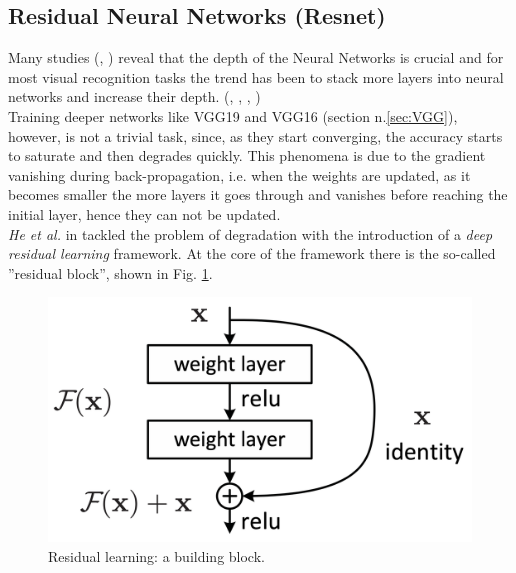 \subsection[Residual Neural Networks]{Residual Neural Networks (Resnet)}
Many studies (\citep{simonyan2015deep}, \cite{szegedy2014going}) reveal that the depth of the Neural Networks is crucial and for most visual recognition tasks the trend has been to stack more layers into neural networks and increase their depth. (\cite{simonyan2015deep}, \cite{ioffe2015batch}, \cite{girshick2014rich}, \cite{2014Spatial})\\
Training deeper networks like VGG19 and VGG16 (section n.\ref{sec:VGG}), however, is not a trivial task, since, as they start converging, the accuracy starts to saturate and then degrades quickly. This phenomena is due to the gradient vanishing during back-propagation, i.e. when the weights are updated, as it becomes smaller the more layers it goes through and vanishes before reaching the initial layer, hence they can not be updated.  \\
\textit{He et al. } in \cite{DBLP:journals/corr/HeZRS15} tackled the problem of degradation with the introduction of a \textit{deep residual learning} framework. At the core of the framework there is the so-called ''residual block'', shown in Fig. \ref{fig:res_block}. 
\begin{figure}[htb]
    \centering
    \includegraphics[scale = 0.3]{img/res_block.png}
    \caption[Residual learning: a building block]{Residual learning: a building block. \cite{DBLP:journals/corr/HeZRS15}}
    \label{fig:res_block}
\end{figure}

